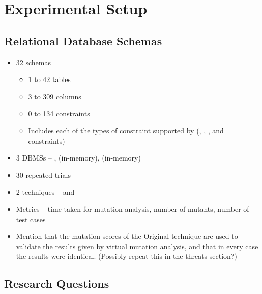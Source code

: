 

\section{Experimental Setup}
\label{sec:experimental-setup}


\subsection{Relational Database Schemas}
\label{sec:subjects}



\begin{itemize}
  \item 32 schemas
    \begin{itemize}
      \item 1 to 42 tables
      \item 3 to 309 columns
      \item 0 to 134 constraints
      \item Includes each of the types of constraint supported by \SchemaAnalyst (\PK, \FK, \NOTNULL, \UNIQUE and \CHECK constraints)
    \end{itemize}
  \item 3 DBMSs -- \Postgres, \HyperSQL (in-memory), \SQLite (in-memory)
  \item 30 repeated trials
  \item 2 techniques -- \Original and \VirtualMutationAnalysis
  \item Metrics -- time taken for mutation analysis, number of mutants, number of test cases
  \item Mention that the mutation scores of the Original technique are used to validate the results given by virtual mutation analysis, and that in every case the results were identical. (Possibly repeat this in the threats section?)
\end{itemize}

\subsection{Research Questions}
\label{sec:research-questions}

